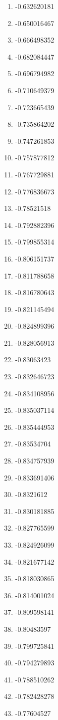 \documentclass[6pt]{article}
\begin{document}
\begin{multicols}{4}
\begin{enumerate}
		\item -0.632620181
		\item -0.650016467
		\item -0.666498352
		\item -0.682084447
		\item -0.696794982
		\item -0.710649379
		\item -0.723665439
		\item -0.735864202
		\item -0.747261853
		\item -0.757877812
		\item -0.767729881
		\item -0.776836673
		\item -0.78521518
		\item -0.792882396
		\item -0.799855314
		\item -0.806151737
		\item -0.811788658
		\item -0.816780643
		\item -0.821145494
		\item -0.824899396
		\item -0.828056913
		\item -0.83063423
		\item -0.832646723
		\item -0.834108956
		\item -0.835037114
		\item -0.835444953
		\item -0.83534704
		\item -0.834757939
		\item -0.833691406
		\item -0.8321612
		\item -0.830181885
		\item -0.827765599
		\item -0.824926099
		\item -0.821677142
		\item -0.818030865
		\item -0.814001024
		\item -0.809598141
		\item -0.80483597
		\item -0.799725841
		\item -0.794279893
		\item -0.788510262
		\item -0.782428278
		\item -0.77604527

\end{enumerate}
\end{multicols}
\end{document}
